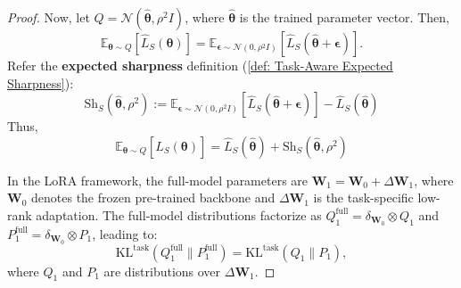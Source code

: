 \documentclass[letterpaper]{article} %
\begin{document}
\begin{proof}
Now, let $Q = \mathcal{N}(\hat{\boldsymbol{\theta}}, \rho^2 I)$, where $\hat{\boldsymbol{\theta}}$ is the trained parameter vector. Then,
$$\mathbb{E}_{\boldsymbol{\theta} \sim Q}[\hat{L}_S(\boldsymbol{\theta})] = \mathbb{E}_{\boldsymbol{\epsilon} \sim \mathcal{N}(0, \rho^2 I)}[\hat{L}_S(\hat{\boldsymbol{\theta}} + \boldsymbol{\epsilon})].$$
Refer the \textbf{expected sharpness} definition (\ref{def: Task-Aware Expected Sharpness}):
$$\mathrm{Sh}_S(\hat{\boldsymbol{\theta}}, \rho^2) := \mathbb{E}_{\boldsymbol{\epsilon} \sim \mathcal{N}(0, \rho^2 I)}\left[ \hat{L}_S(\hat{\boldsymbol{\theta}} + \boldsymbol{\epsilon}) \right] - \hat{L}_S(\hat{\boldsymbol{\theta}})$$
Thus,
$$\mathbb{E}_{\boldsymbol{\theta} \sim Q}[\hat{L}_S(\boldsymbol{\theta})] = \hat{L}_S(\hat{\boldsymbol{\theta}}) + \mathrm{Sh}_S(\hat{\boldsymbol{\theta}}, \rho^2)$$

In the LoRA framework, the full-model parameters are $\boldsymbol{W}_1 = \boldsymbol{W}_0 + \Delta\boldsymbol{W}_1$, where $\boldsymbol{W}_0$ denotes the frozen pre-trained backbone and $\Delta\boldsymbol{W}_1$ is the task-specific low-rank adaptation. The full-model distributions factorize as $Q_1^{\text{full}} = \delta_{\boldsymbol{W}_0} \otimes Q_1$ and $P_1^{\text{full}} = \delta_{\boldsymbol{W}_0} \otimes P_1$, leading to:
\begin{equation}
    \text{KL}^{\text{task}}(Q_1^{\text{full}} \| P_1^{\text{full}}) = \text{KL}^{\text{task}}(Q_1 \| P_1),
\end{equation}
where $Q_1$ and $P_1$ are distributions over $\Delta\boldsymbol{W}_1$. 



\end{proof}
\end{document}

